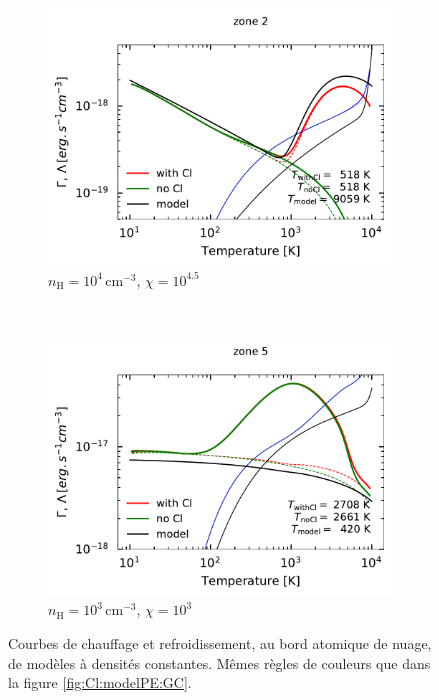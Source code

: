 \begin{figure}[!h]
    \centering
    \begin{subfigure}[t]{0.49\textwidth} %
        \centering \includegraphics[trim = {0 0 0 1cm },clip,width=1\textwidth]{figure/Cl/particuliers/GCcomp_Cl_2.pdf}
        \caption{$n_\mathrm{H}=10^4 \, \mathrm{cm}^{-3}$, $\chi=10^{4.5}$}
        \label{fig:Cl:particulier:2}
    \end{subfigure}
    ~ 
    \begin{subfigure}[t]{0.49\textwidth}
        \centering \includegraphics[trim = {0 0 0 1cm },clip,width=1\textwidth]{figure/Cl/particuliers/GCcomp_Cl_5.pdf}
        \caption{$n_\mathrm{H}=10^3 \, \mathrm{cm}^{-3}$, $\chi=10^3$}
        \label{fig:Cl:particulier:4}
    \end{subfigure}
    \caption{Courbes de chauffage et refroidissement, au bord atomique de nuage, de modèles à densités constantes. Mêmes règles de couleurs que dans la figure \ref{fig:Cl:modelPE:GC}.}
\end{figure}



